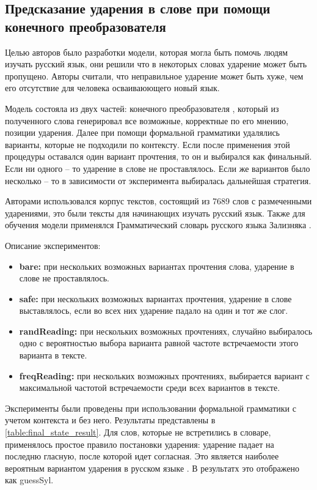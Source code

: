 \documentclass[14pt, a4paper, russian]{report}
\begin{document}
\begin{normalsize}
\section{Предсказание ударения в слове при помощи конечного преобразователя}

Целью авторов\cite{reynolds} было разработки модели, которая могла быть помочь людям изучать русский язык, они решили что в некоторых словах ударение может быть пропущено. Авторы считали, что неправильное ударение может быть хуже, чем его отсутствие для человека осваиваюющего новый язык.

Модель состояла из двух частей: конечного преобразователя \cite{koskenniemi, karttunen}, который из полученного слова генерировал все возможные, корректные по его мнению, позиции ударения. Далее при помощи формальной грамматики \cite{karlsson} удалялись варианты, которые не подходили по контексту. Если после применения этой процедуры оставался один вариант прочтения, то он и выбирался как финальный. Если ни одного -- то ударение в слове не проставлялось. Если же вариантов было несколько -- то в зависимости от эксперимента выбиралась дальнейшая стратегия. 

Авторами использовался корпус текстов, состоящий из 7689 слов с размеченными ударениями, это были тексты для начинающих изучать русский язык. Также для обучения модели применялся Грамматический словарь русского языка Зализняка \cite{zaliz}. 

Описание экспериментов:
\begin{itemize}
	\item \textbf{bare:} при нескольких возможных вариантах прочтения  слова, ударение в слове не проставлялось.
	\item \textbf{safe:}  при нескольких возможных вариантах прочтения, ударение в слове выставлялось, если во всех них ударение падало на один и тот же слог.
	\item \textbf{randReading:} при нескольких возможных прочтениях, случайно выбиралось одно с вероятностью выбора варианта равной частоте встречаемости этого варианта в тексте.
	
	\item \textbf{freqReading:} при нескольких возможных прочтениях, выбирается вариант с максимальной  частотой встречаемости среди всех  вариантов в тексте.
\end{itemize}


Эксперименты были проведены при использовании формальной грамматики с учетом контекста и без него. Результаты представлены в \cref{table:final_state_result}. Для слов, которые не встретились в словаре, применялось простое правило постановки ударения: ударение падает на последню гласную, после которой идет согласная. Это является наиболее вероятным вариантом ударения в русском языке \cite{lavitskaya}. В результатх это отображено как guessSyl.


\end{normalsize}
\end{document}
